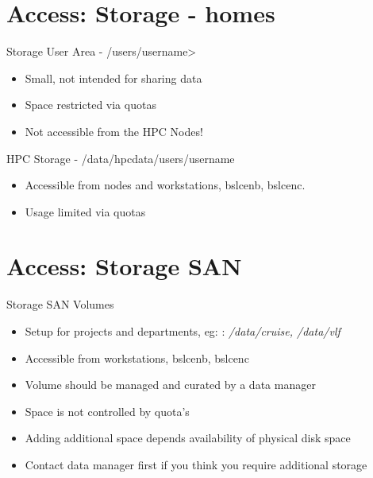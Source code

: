 {
\section{Access: Storage - homes}
%
\begin{frame}{Storage}
\text User Area - /users/\<username>\
\begin{itemize}
\item Small, not intended for sharing data
\item Space restricted via quotas
\item Not accessible from the HPC Nodes!
\end{itemize}
\text HPC Storage - /data/hpcdata/users/username
\begin{itemize}
\item Accessible from nodes and workstations, bslcenb, bslcenc.
\item Usage limited via quotas
\end{itemize}
\end{frame}
}

{
\section{Access: Storage SAN}
%
\begin{frame}{Storage SAN Volumes}
\begin{itemize}
\item Setup for projects and departments, eg: : \textit{/data/cruise, /data/vlf}
\item Accessible from workstations, bslcenb, bslcenc
\item Volume should be managed and curated by a data manager
\item Space is not controlled by quota's
\item Adding additional space depends availability of physical disk space
\item Contact data manager first if you think you require additional storage
\end{itemize}
\end{frame}
}

